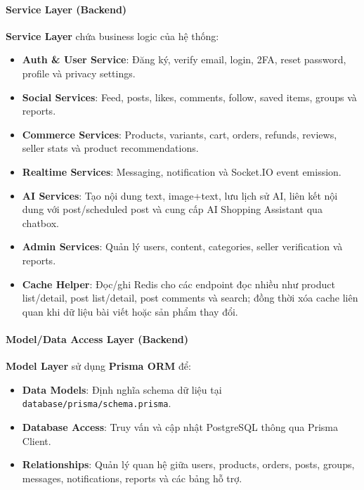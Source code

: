 \paragraph{Service Layer (Backend)} \textbf{Service Layer} chứa business logic của hệ thống:
\begin{itemize}
    \item \textbf{Auth \& User Service}: Đăng ký, verify email, login, 2FA, reset password, profile và privacy settings.
    \item \textbf{Social Services}: Feed, posts, likes, comments, follow, saved items, groups và reports.
    \item \textbf{Commerce Services}: Products, variants, cart, orders, refunds, reviews, seller stats và product recommendations.
    \item \textbf{Realtime Services}: Messaging, notification và Socket.IO event emission.
    \item \textbf{AI Services}: Tạo nội dung text, image+text, lưu lịch sử AI, liên kết nội dung với post/scheduled post và cung cấp AI Shopping Assistant qua chatbox.
    \item \textbf{Admin Services}: Quản lý users, content, categories, seller verification và reports.
    \item \textbf{Cache Helper}: Đọc/ghi Redis cho các endpoint đọc nhiều như product list/detail, post list/detail, post comments và search; đồng thời xóa cache liên quan khi dữ liệu bài viết hoặc sản phẩm thay đổi.
\end{itemize}

\paragraph{Model/Data Access Layer (Backend)} \textbf{Model Layer} sử dụng \textbf{Prisma ORM} để:
\begin{itemize}
    \item \textbf{Data Models}: Định nghĩa schema dữ liệu tại \texttt{database/prisma/schema.prisma}.
    \item \textbf{Database Access}: Truy vấn và cập nhật PostgreSQL thông qua Prisma Client.
    \item \textbf{Relationships}: Quản lý quan hệ giữa users, products, orders, posts, groups, messages, notifications, reports và các bảng hỗ trợ.
\end{itemize}

